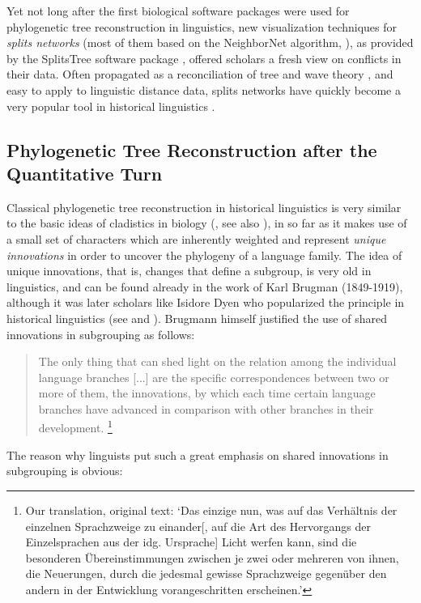 \documentclass[svgnames,12pt]{scrartcl}
\begin{document}
{Yet not long after the first biological software packages were used for phylogenetic tree
reconstruction in linguistics, new
visualization techniques for \emph{splits networks} (most of them based on the NeighborNet algorithm,
\citealt{Bryant2004}), as provided by the SplitsTree software package \citep{Huson1998}, offered
scholars a fresh view on conflicts in their data. Often propagated as a reconciliation of
tree and wave theory \citep{Hamed2006,McMahon2005}, and easy to apply to
linguistic distance data, splits networks have quickly become a very popular tool in historical
linguistics \citep{Heggarty2010,Hamed2005,Bowern2010}.


\subsection{Phylogenetic Tree Reconstruction after the Quantitative Turn}
Classical phylogenetic tree reconstruction in historical linguistics is very similar to the basic
ideas of cladistics in biology (\citealt{Hennig1950}, see also \citealt[105-171]{Lass1997}), in so
far as it makes use of a small set of characters which are inherently weighted and represent \emph{unique
innovations} in order to uncover the phylogeny of a language family. The idea of unique innovations,
that is, changes that define a subgroup, is very old in linguistics, and can be found already in the
work of Karl Brugman (1849-1919), although it was later scholars like Isidore Dyen who
popularized the principle in historical linguistics (see \citealt{Chretien1963} and
\citealt{Dyen1953}). Brugmann himself justified the use of shared innovations in subgrouping as
follows:
\begin{quote}
  \small The only thing that can shed light on the relation among the individual language branches [...] are the
  specific correspondences between two or more of them, the innovations, by which each time certain
  language branches have advanced in comparison with other branches in their
  development. \cite[24]{Brugmann1886}\footnote{Our translation, original text: `Das einzige nun, was auf das Verhältnis der
  einzelnen Sprachzweige zu einander[, auf die Art des Hervorgangs der Einzelsprachen aus der idg.
  Ursprache] Licht werfen kann, sind die besonderen Übereinstimmungen zwischen je zwei oder mehreren
  von ihnen, die Neuerungen, durch die jedesmal gewisse Sprachzweige gegenüber den andern in der
  Entwicklung vorangeschritten erscheinen.'}
\end{quote}
The reason why linguists put such a great emphasis on shared innovations in subgrouping is obvious:
}
\end{document}
